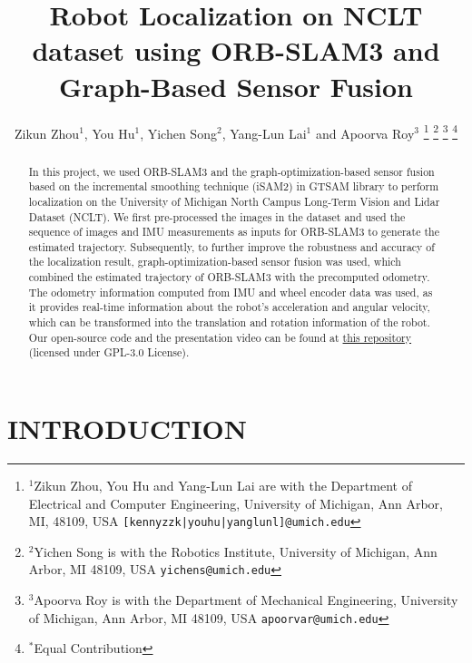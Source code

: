 \documentclass[letterpaper, 10 pt, conference]{ieeeconf}  %
\title{\LARGE \bf
Robot Localization on NCLT dataset using ORB-SLAM3 and Graph-Based Sensor Fusion
}
\author{Zikun Zhou$^{1}$, You Hu$^{1}$, Yichen Song$^{2}$, Yang-Lun Lai$^{1}$ and Apoorva Roy$^{3}$%
\thanks{$^{1}$Zikun Zhou, You Hu and Yang-Lun Lai are with the Department of Electrical and Computer Engineering, University of Michigan, Ann Arbor, MI, 48109, USA
        {\tt\small [kennyzzk|youhu|yanglunl]@umich.edu}}%
\thanks{$^{2}$Yichen Song is with the Robotics Institute, University of Michigan, 
        Ann Arbor, MI 48109, USA
        {\tt\small yichens@umich.edu}}%
\thanks{$^{3}$Apoorva Roy is with the Department of Mechanical Engineering, University of Michigan, Ann Arbor, MI 48109, USA
        {\tt\small apoorvar@umich.edu}}%
\thanks{$^{*}$Equal Contribution}
}
\begin{document}
\maketitle
\thispagestyle{empty}
\pagestyle{empty}


\begin{abstract}

In this project, we used ORB-SLAM3 and the graph-optimization-based sensor fusion based on the incremental smoothing technique (iSAM2) in GTSAM library to perform localization on the University of Michigan North Campus Long-Term Vision and Lidar Dataset (NCLT). We first pre-processed the images in the dataset and used the sequence of images and IMU measurements as inputs for ORB-SLAM3 to generate the estimated trajectory. Subsequently, to further improve the robustness and accuracy of the localization result, graph-optimization-based sensor fusion was used, which combined the estimated trajectory of ORB-SLAM3 with the precomputed odometry. The odometry information computed from IMU and wheel encoder data was used, as it provides real-time information about the robot's acceleration and angular velocity, which can be transformed into the translation and rotation information of the robot. Our open-source code and the presentation video can be found at \href{https://github.com/kennyzzk/Robot-Localization-on-NCLT-dataset-using-ORB-SLAM-III-and-Graph-Based-Sensor-Fusion}{this repository} (licensed under GPL-3.0 License).


\end{abstract}


\section{INTRODUCTION}
\end{document}
